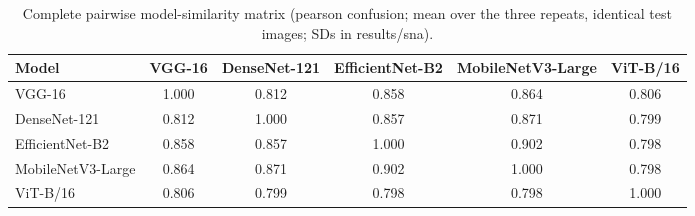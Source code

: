 \begin{table}[!tbp]
\centering
\caption{Complete pairwise model-similarity matrix (pearson confusion; mean over the three repeats, identical test images; SDs in results/sna).}
\label{tab:sim_pearson_confusion}
\footnotesize
\begin{tabular}{lccccc}
\hline
Model & VGG-16 & DenseNet-121 & EfficientNet-B2 & MobileNetV3-Large & ViT-B/16 \\
\hline
VGG-16 & 1.000 & 0.812 & 0.858 & 0.864 & 0.806 \\
DenseNet-121 & 0.812 & 1.000 & 0.857 & 0.871 & 0.799 \\
EfficientNet-B2 & 0.858 & 0.857 & 1.000 & 0.902 & 0.798 \\
MobileNetV3-Large & 0.864 & 0.871 & 0.902 & 1.000 & 0.798 \\
ViT-B/16 & 0.806 & 0.799 & 0.798 & 0.798 & 1.000 \\
\hline
\end{tabular}
\end{table}